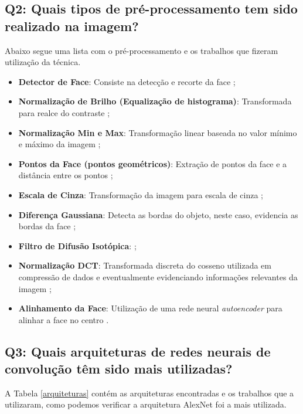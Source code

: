 \subsection{Q2: Quais tipos de pré-processamento tem sido realizado na imagem?}\label{sec:q2}
Abaixo segue uma lista com o pré-processamento e os trabalhos que fizeram utilização da técnica. 
\begin{itemize}
 \item \textbf{Detector de Face}: Consiste na detecção e recorte da face \citep{art1,art2,art6,art9,art12,art13,art15};
 \item \textbf{Normalização de Brilho (Equalização de histograma)}: Transformada para realce do contraste \citep{art2,art4,art6};
\item \textbf{Normalização Min e Max}: Transformação linear baseada no valor mínimo e máximo da imagem \citep{art4};
\item \textbf{Pontos da Face (pontos geométricos)}: Extração de pontos da face e a distância entre os pontos \citep{art11};
\item \textbf{Escala de Cinza}: Transformação da imagem para escala de cinza \citep{art12};
\item \textbf{Diferença Gaussiana}: Detecta as bordas do objeto, neste caso, evidencia as bordas da face \citep{art6};
\item \textbf{Filtro de Difusão Isotópica}: \citep{art6};
\item \textbf{Normalização DCT}: Transformada discreta do cosseno utilizada em compressão de dados e eventualmente evidenciando informações relevantes da imagem \citep{art6};
\item \textbf{Alinhamento da Face}: Utilização de uma rede neural \textit{autoencoder} para alinhar a face no centro \citep{art4}.
\end{itemize}

\subsection{Q3: Quais arquiteturas de redes neurais de convolução têm sido mais utilizadas?}
A Tabela \ref{arquiteturas} contém as arquiteturas encontradas e os trabalhos que a utilizaram, como podemos verificar a arquitetura AlexNet foi a mais utilizada.

